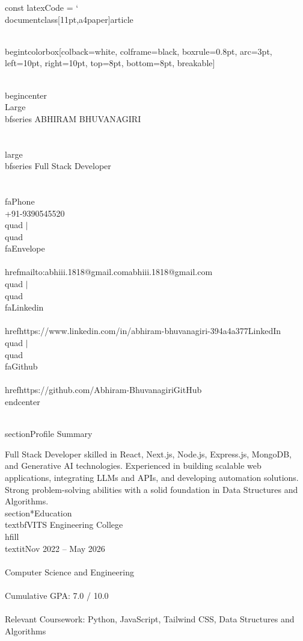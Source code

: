 const latexCode = `\\documentclass[11pt,a4paper]{article}
\begin{document}
\\begin{tcolorbox}[colback=white, colframe=black, 
                  boxrule=0.8pt, arc=3pt,
                  left=10pt, right=10pt, top=8pt, bottom=8pt,
                  breakable]

\\begin{center}
  {\\Large\\bfseries ABHIRAM BHUVANAGIRI} \\\\[4pt]
  {\\large\\bfseries Full Stack Developer} \\\\[8pt]

  \\faPhone\\ +91-9390545520 \\quad $|$ \\quad
  \\faEnvelope\\ \\href{mailto:abhiii.1818@gmail.com}{abhiii.1818@gmail.com} \\quad $|$ \\quad
  \\faLinkedin\\ \\href{https://www.linkedin.com/in/abhiram-bhuvanagiri-394a4a377}{LinkedIn} \\quad $|$ \\quad
  \\faGithub\\ \\href{https://github.com/Abhiram-Bhuvanagiri}{GitHub}
\\end{center}

\\section{Profile Summary}

Full Stack Developer skilled in React, Next.js, Node.js, Express.js, MongoDB, and Generative AI technologies. Experienced in building scalable web applications, integrating LLMs and APIs, and developing automation solutions. Strong problem-solving abilities with a solid foundation in Data Structures and Algorithms.
\\section*{Education}
\\textbf{VITS Engineering College} \\hfill \\textit{Nov 2022 -- May 2026} \\\\
Computer Science and Engineering \\\\
Cumulative GPA: 7.0 / 10.0 \\\\
Relevant Coursework: Python, JavaScript, Tailwind CSS, Data Structures and Algorithms
\end{document}
